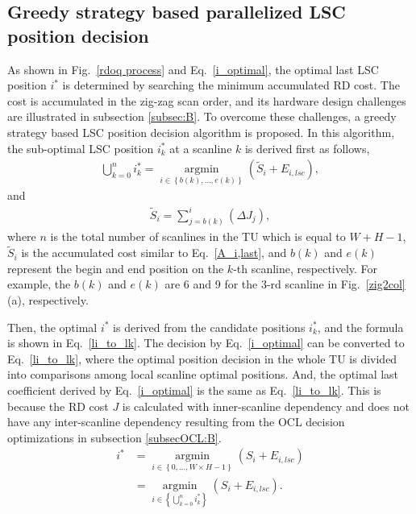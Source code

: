 \documentclass[lettersize,journal]{IEEEtran}
\begin{document}
\subsection{Greedy strategy based parallelized LSC position decision}
\label{subsecgreedy}
As shown in Fig.~\ref{rdoq process} and Eq.~\eqref{i_optimal}, the optimal last LSC position $i^{*}$ is determined by searching the minimum accumulated RD cost. The cost is accumulated in the zig-zag scan order, and its hardware design challenges are illustrated in subsection \ref{subsec:B}. To overcome these challenges, a greedy strategy based LSC position decision algorithm is proposed. In this algorithm, the sub-optimal LSC position $i_{k}^{*}$ at a scanline $k$ is derived first as follows, 
\begin{equation}
	\begin{aligned}
		\label{lk_optimal}
		\bigcup_{k=0}^{n} i_{k}^{*} 
		=\mathop{\arg\min}\limits_{i \in \left \{ b(k),...,e(k)\right \} } \left ( \widetilde{S}_{i}+ E_{i,lsc} \right ), 
	\end{aligned}
\end{equation}
and
\begin{equation}
	\begin{aligned}
		\label{S'i,last}
		\widetilde{S}_{i} = \sum_{j=b(k)}^{i}\left ( \Delta J_{j} \right),
	\end{aligned}
\end{equation}
where $n$ is the total number of scanlines in the TU which is equal to $W+H-1$, $\widetilde{S}_{i}$ is the accumulated cost similar to Eq.~\eqref{A_i,last}, and $b(k)$ and $e(k)$ represent the begin and end position on the $k$-th scanline, respectively. For example, the $b(k)$ and $e(k)$ are 6 and 9 for the 3-rd scanline in Fig.~\ref{zig2col}(a), respectively. 
\par
Then, the optimal $i^{*}$ is derived from the candidate positions $i_{k}^{*}$, and the formula is shown in Eq.~\eqref{li_to_lk}. The decision by Eq.~\eqref{i_optimal} can be converted to Eq.~\eqref{li_to_lk}, where the optimal position decision in the whole TU is divided into comparisons among local scanline optimal positions. And, the optimal last coefficient derived by Eq.~\eqref{i_optimal} is the same as Eq.~\eqref{li_to_lk}. This is because the RD cost $J$ is calculated with inner-scanline dependency and does not have any inter-scanline dependency resulting from the OCL decision optimizations in subsection \ref{subsecOCL:B}. 
\begin{equation}
	\begin{aligned}
		\label{li_to_lk}
		i^{*} &=\mathop{\arg\min}\limits_{i \in \left \{  0,...,W \times H - 1 \right \} } \left ( S_{i} + E_{i,lsc}   \right )
		\\&=\mathop{\arg\min}\limits_{i \in \left \{ \bigcup\limits_{k=0}^{n} i_{k}^{*} \right  \} } \left ( S_{i} + E_{i,lsc}   \right ) .
	\end{aligned}
\end{equation}
\end{document}
